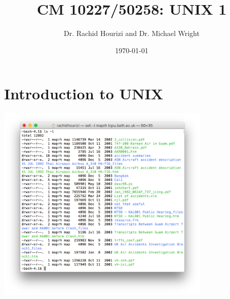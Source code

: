 \documentclass{beamer}
\begin{document}

\title{CM 10227/50258: UNIX 1}
\author{Dr. Rachid Hourizi and Dr. Michael Wright }
\date{\today}
\frame{\titlepage}

\section{Introduction to UNIX}

\begin{frame}
\includegraphics[height=9.5cm,keepaspectratio]{terminal}
\end{frame}
\end{document}

